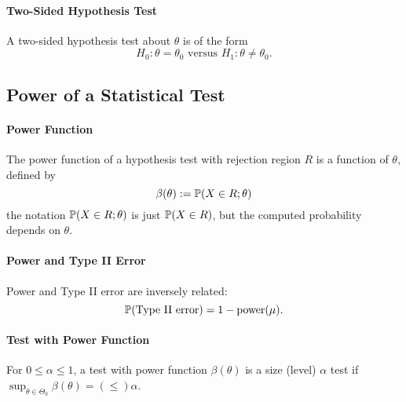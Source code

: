 \paragraph{Two-Sided Hypothesis Test}
A two-sided hypothesis test about \(\theta\) is of the form
\[H_0: \theta = \theta_0 \text{ versus } H_1: \theta \neq \theta_0.\]

\subsection{Power of a Statistical Test}

\paragraph{Power Function}
The power function of a hypothesis test with rejection region \(R\) is a function of \(\theta\), defined by
\[\beta(\theta) := \mathbb{P}(X \in R; \theta)\]
the notation \(\mathbb{P}(X \in R; \theta)\) is just \(\mathbb{P}(X \in R)\), but the computed probability depends on \(\theta\).

\paragraph{Power and Type II Error}
Power and Type II error are inversely related:
\[\mathbb{P}(\text{Type II error}) = 1 - \mathrm{power}(\mu).\]

\paragraph{Test with Power Function}
For \(0 \leq \alpha \leq 1\), a test with power function \(\beta(\theta)\) is a size (level) \(\alpha\) test if \(\sup_{\theta \in \Theta_0} \beta(\theta) = (\leq)\alpha\).

